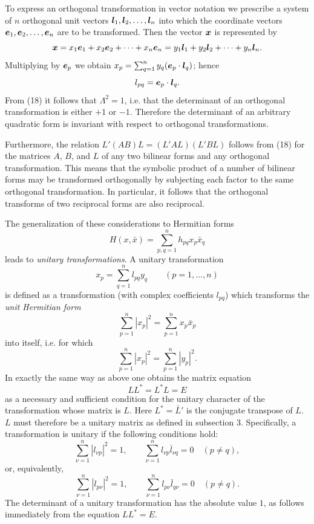 To express an orthogonal transformation in vector notation we prescribe a system of $n$ orthogonal unit vectors $\bm{l}_1,\bm{l}_2,\ldots,\bm{l}_n$ into which the coordinate vectors $\bm{e}_1,\bm{e}_2,\ldots,\bm{e}_n$ are to be transformed. Then the vector $\bm{x}$ is represented by
\[
\bm{x}=x_1\bm{e}_1+x_2\bm{e}_2+\cdots+x_n\bm{e}_n
=y_1\bm{l}_1+y_2\bm{l}_2+\cdots+y_n\bm{l}_n.
\]
Multiplying by $\bm{e}_p$ we obtain $x_p=\sum_{q=1}^{n}y_q(\bm{e}_p\cdot\bm{l}_q)$; hence
\[
l_{pq}=\bm{e}_p\cdot\bm{l}_q.
\]
From (18) it follows that $\Lambda^2=1$, i.e. that the determinant of an orthogonal transformation is either $+1$ or $-1$. Therefore the determinant of an arbitrary quadratic form is invariant with respect to orthogonal transformations.

Furthermore, the relation $L'(AB)L=(L'AL)(L'BL)$ follows from (18) for the matrices $A$, $B$, and $L$ of any two bilinear forms and any orthogonal transformation. This means that the symbolic product of a number of bilinear forms may be transformed orthogonally by subjecting each factor to the same orthogonal transformation. In particular, it follows that the orthogonal transforms of two reciprocal forms are also reciprocal.

The generalization of these considerations to Hermitian forms
\[
H(x,\bar x)=\sum_{p,q=1}^{n}h_{pq}x_p\bar x_q
\]
leads to \emph{unitary transformations}. A unitary transformation
\[
x_p=\sum_{q=1}^{n}l_{pq}y_q\qquad(p=1,\ldots,n)
\]
is defined as a transformation (with complex coefficients $l_{pq}$) which transforms the \emph{unit Hermitian form}
\[
\sum_{p=1}^{n}|x_p|^2=\sum_{p=1}^{n}x_p\bar x_p
\]
into itself, i.e. for which
\[
\sum_{p=1}^{n}|x_p|^2=\sum_{p=1}^{n}|y_p|^2.
\]
In exactly the same way as above one obtains the matrix equation
\[
LL^*=L^*L=E
\]
as a necessary and sufficient condition for the unitary character of the transformation whose matrix is $L$. Here $L^*=\bar L'$ is the conjugate transpose of $L$. $L$ must therefore be a unitary matrix as defined in subsection 3. Specifically, a transformation is unitary if the following conditions hold:
\begin{equation*}
\sum_{\nu=1}^{n}|l_{\nu p}|^2=1,
\qquad
\sum_{\nu=1}^{n}l_{\nu p}\bar l_{\nu q}=0\quad(p\ne q),
\tag{22}
\end{equation*}
or, equivalently,
\begin{equation*}
\sum_{\nu=1}^{n}|l_{p\nu}|^2=1,
\qquad
\sum_{\nu=1}^{n}l_{p\nu}\bar l_{q\nu}=0\quad(p\ne q).
\tag{23}
\end{equation*}
The determinant of a unitary transformation has the absolute value $1$, as follows immediately from the equation $LL^*=E$.


